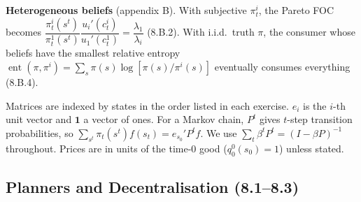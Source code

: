 \documentclass[12pt, letterpaper]{article}
\newcommand{\ent}{\operatorname{ent}}
\begin{document}
\begin{tcolorbox}[theorybox,title={Chapter 8 Overview}]
\textbf{Heterogeneous beliefs} (appendix B). With subjective $\pi^i_t$, the Pareto FOC becomes
$\dfrac{\pi^i_t(s^t)}{\pi^1_t(s^t)}\dfrac{u_i'(c^i_t)}{u_1'(c^1_t)}=\dfrac{\lambda_1}{\lambda_i}$ (8.B.2). With i.i.d.\
truth $\pi$, the consumer whose beliefs have the smallest relative entropy
$\ent(\pi,\pi^i)=\sum_s\pi(s)\log[\pi(s)/\pi^i(s)]$ eventually consumes everything (8.B.4).
\end{tcolorbox}

\begin{tcolorbox}[databox,title={Conventions used throughout}]
Matrices are indexed by states in the order listed in each exercise. $e_i$ is the $i$-th unit vector and
$\mathbf 1$ a vector of ones. For a Markov chain, $P^t$ gives $t$-step transition probabilities, so
$\sum_{s^t}\pi_t(s^t)f(s_t)=e_{s_0}'P^tf$. We use $\sum_t\beta^tP^t=(I-\beta P)^{-1}$ throughout. Prices are in
units of the time-0 good ($q^0_0(s_0)=1$) unless stated.
\end{tcolorbox}

\subsection{Planners and Decentralisation (8.1--8.3)}
\end{document}
